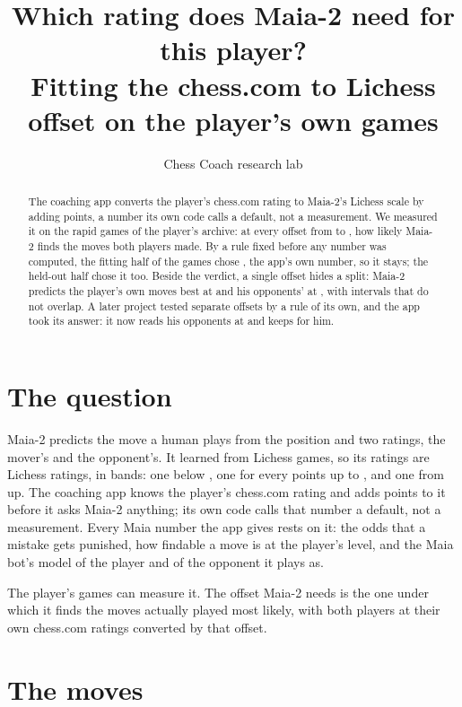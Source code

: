 \documentclass[11pt]{article}
\title{Which rating does Maia-2 need for this player?\\[0.3em]
\large Fitting the chess.com to Lichess offset on the player's own games}
\author{Chess Coach research lab}
\date{}
\begin{document}
\maketitle

\begin{abstract}
The coaching app converts the player's chess.com rating to Maia-2's Lichess scale by adding
\AppOffset{} points, a number its own code calls a default, not a measurement. We measured it on
the \Games{} rapid games of the player's archive: at every offset from \OffsetMin{} to
\OffsetMax, how likely Maia-2 finds the \Moves{} moves both players made. By a rule fixed before
any number was computed, the fitting half of the games chose \Fitted, the app's own number, so it
stays; the held-out half chose it too. Beside the verdict, a single offset hides a split: Maia-2
predicts the player's own moves best at \BestHim{} and his opponents' at \BestOpp, with intervals
that do not overlap. A later project tested separate offsets by a rule of its own, and the app
took its answer: it now reads his opponents at \AppOpponentOffset{} and keeps \AppOffset{} for him.
\end{abstract}

\section{The question}

Maia-2 predicts the move a human plays from the position and two ratings, the mover's and the
opponent's. It learned from Lichess games, so its ratings are Lichess ratings, in \MaiaBands{}
bands: one below \MaiaStart, one for every \MaiaWidth{} points up to \MaiaEnd, and one from
\MaiaEnd{} up. The coaching app knows the player's chess.com rating and adds \AppOffset{} points
to it before it asks Maia-2 anything; its own code calls that number a default, not a
measurement. Every Maia number the app gives rests on it: the odds that a mistake gets punished,
how findable a move is at the player's level, and the Maia bot's model of the player and of the
opponent it plays as.

The player's games can measure it. The offset Maia-2 needs is the one under which it finds the
moves actually played most likely, with both players at their own chess.com ratings converted by
that offset.

\section{The moves}
\end{document}
